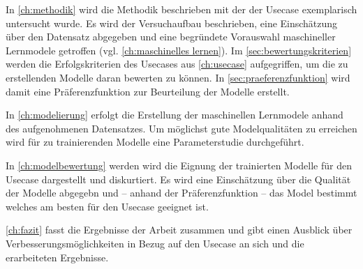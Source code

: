 In \cref{ch:methodik} wird die Methodik beschrieben mit der der Usecase exemplarisch untersucht wurde. Es wird der Versuchaufbau beschrieben, eine Einschätzung über den Datensatz abgegeben und eine begründete Vorauswahl maschineller Lernmodele getroffen (vgl. \cref{ch:maschinelles lernen}). Im \cref{sec:bewertungskriterien} werden die Erfolgskriterien des Usecases aus \cref{ch:usecase} aufgegriffen, um die zu erstellenden Modelle daran bewerten zu können. In \cref{sec:praeferenzfunktion} wird damit eine Präferenzfunktion zur Beurteilung der Modelle erstellt.

In \cref{ch:modelierung} erfolgt die Erstellung der maschinellen Lernmodele anhand des aufgenohmenen Datensatzes. Um möglichst gute Modelqualitäten zu erreichen wird für zu trainierenden Modelle eine Parameterstudie durchgeführt.

In \cref{ch:modelbewertung} werden wird die Eignung der trainierten Modelle für den Usecase dargestellt und diskurtiert. Es wird eine Einschätzung über die Qualität der Modelle abgegebn und -- anhand der Präferenzfunktion -- das Model bestimmt welches am besten für den Usecase geeignet ist.

\cref{ch:fazit} fasst die Ergebnisse der Arbeit zusammen und gibt einen Ausblick über Verbesserungsmöglichkeiten in Bezug auf den Usecase an sich und die erarbeiteten Ergebnisse.